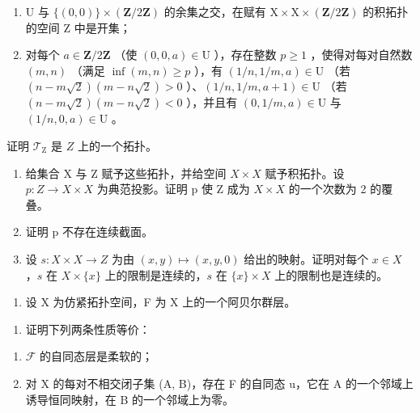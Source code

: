 \begin{enumerate}
\def\labelenumi{(\roman{enumi})}
\item
  U 与 \(\{(0,0)\} \times (\mathbf{Z}/2\mathbf{Z})\) 的余集之交，在赋有 \(\mathrm{X} \times \mathrm{X} \times (\mathbf{Z}/2\mathbf{Z})\) 的积拓扑的空间 Z 中是开集；
\item
  对每个 \(a \in \mathbf{Z}/2\mathbf{Z}\) （使 \((0,0,a) \in \mathrm{U}\) ），存在整数 \(p \geqslant 1\) ，使得对每对自然数 \((m,n)\) （满足 \(\inf(m,n) \geqslant p\) ），有 \((1/n,1/m,a) \in \mathrm{U}\) （若 \((n-m\sqrt{2})(m-n\sqrt{2}) > 0\) ）、\((1/n,1/m,a+1) \in \mathrm{U}\) （若 \((n-m\sqrt{2})(m-n\sqrt{2}) < 0\) ），并且有 \((0,1/m,a) \in \mathrm{U}\) 与 \((1/n,0,a) \in \mathrm{U}\) 。
\end{enumerate}

证明 \(\mathcal{T}_{\mathrm{Z}}\) 是 \(Z\) 上的一个拓扑。

\begin{enumerate}
\def\labelenumi{\alph{enumi})}
\setcounter{enumi}{2}
\item
  给集合 X 与 Z 赋予这些拓扑，并给空间 \(X \times X\) 赋予积拓扑。设 \(p: Z \to X \times X\) 为典范投影。证明 p 使 Z 成为 \(X \times X\) 的一个次数为 2 的覆叠。
\item
  证明 p 不存在连续截面。
\item
  设 \(s: X \times X \to Z\) 为由 \((x, y) \mapsto (x, y, 0)\) 给出的映射。证明对每个 \(x \in X\) ，\(s\) 在 \(X \times \{x\}\) 上的限制是连续的，\(s\) 在 \(\{x\} \times X\) 上的限制也是连续的。
\end{enumerate}

\exercisegroup

\begin{enumerate}
\def\labelenumi{\arabic{enumi})}
\tightlist
\item
  设 X 为仿紧拓扑空间，F 为 X 上的一个阿贝尔群层。
\end{enumerate}

\begin{enumerate}
\def\labelenumi{\alph{enumi})}
\tightlist
\item
  证明下列两条性质等价：
\end{enumerate}

\begin{enumerate}
\def\labelenumi{(\roman{enumi})}
\item
  \(\mathcal{F}\) 的自同态层是柔软的；
\item
  对 X 的每对不相交闭子集 (A, B)，存在 F 的自同态 u，它在 A 的一个邻域上诱导恒同映射，在 B 的一个邻域上为零。
\end{enumerate}

